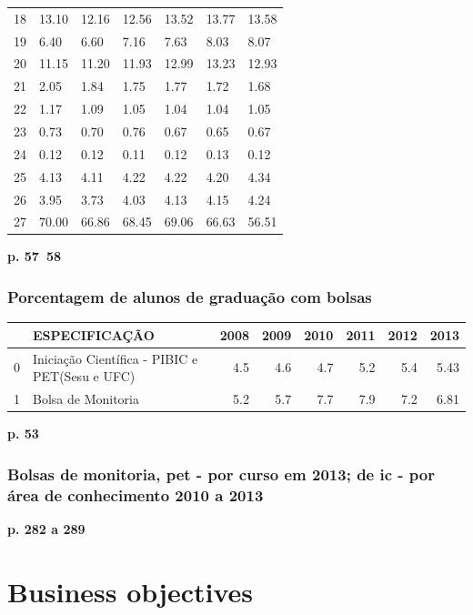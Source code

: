 \documentclass{report}
\begin{document}
\begin{tabular}{lllllll}
18        &  13.10 &  12.16 &  12.56 &  13.52 &  13.77 &  13.58 \\
19        &  6.40 &  6.60 &  7.16 &  7.63 &  8.03 &  8.07 \\
20        &  11.15 &  11.20 &  11.93 &  12.99 &  13.23 &  12.93 \\
21        &  2.05 &  1.84 &  1.75 &  1.77 &  1.72 &  1.68 \\
22        &  1.17 &  1.09 &  1.05 &  1.04 &  1.04 &  1.05 \\
23        &  0.73 &  0.70 &  0.76 &  0.67 &  0.65 &  0.67 \\
24        &  0.12 &  0.12 &  0.11 &  0.12 &  0.13 &  0.12 \\
25        &  4.13 &  4.11 &  4.22 &  4.22 &  4.20 &  4.34 \\
26        &  3.95 &  3.73 &  4.03 &  4.13 &  4.15 &  4.24 \\
27        &  70.00 &  66.86 &  68.45 &  69.06 &  66.63 &  56.51 \\
\bottomrule
\end{tabular}

\textbf{p. 57~58}

\subsection{Porcentagem de alunos de graduação com bolsas}
\begin{tabular}{llrrrrrr}
\toprule
{} &                                   ESPECIFICAÇÃO &  2008 &  2009 &  2010 &  2011 &  2012 &  2013 \\
\midrule
0 &  Iniciação Científica - PIBIC e PET(Sesu e UFC) &   4.5 &   4.6 &   4.7 &   5.2 &   5.4 &  5.43 \\
1 &                              Bolsa de Monitoria &   5.2 &   5.7 &   7.7 &   7.9 &   7.2 &  6.81 \\
\bottomrule
\end{tabular}

\textbf{p. 53}

\subsection{Bolsas de monitoria, pet - por curso em 2013; de ic - por área de conhecimento 2010 a 2013}
\textbf{p. 282 a 289}

\chapter{Business objectives}
\end{document}

